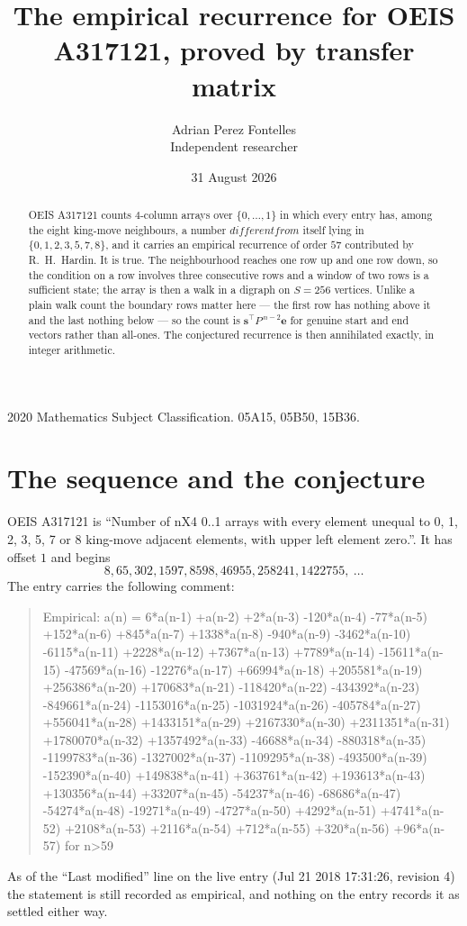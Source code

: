 \documentclass[11pt,a4paper]{article}
\title{The empirical recurrence for OEIS A317121, proved by transfer matrix}
\author{Adrian Perez Fontelles\\ \small Independent researcher}
\date{31 August 2026}
\theoremstyle{plain}
\theoremstyle{definition}
\begin{document}
\maketitle

\begin{abstract}
OEIS A317121 counts $4$-column arrays over $\{0,\dots,1\}$ in which every entry has,
among the eight king-move neighbours, a number $different from$ itself lying in $\{0,1,2,3,5,7,8\}$, and it carries an empirical
recurrence of order $57$ contributed by R.~H.~Hardin. It is true. The neighbourhood
reaches one row up and one row down, so the condition on a row involves three consecutive
rows and a window of two rows is a sufficient state; the array is then a walk in a digraph
on $S=256$ vertices. Unlike a plain walk count the boundary rows matter here --- the first
row has nothing above it and the last nothing below --- so the count is
$\mathbf{s}^{\!\top}P^{\,n-2}\mathbf{e}$ for genuine start and end vectors rather than
all-ones. The conjectured recurrence is then annihilated exactly, in integer arithmetic.
\end{abstract}

\noindent\small 2020 Mathematics Subject Classification. 05A15, 05B50, 15B36.\normalsize

\section{The sequence and the conjecture}

OEIS A317121 is ``Number of nX4 0..1 arrays with every element unequal to 0, 1, 2, 3, 5, 7 or 8 king-move adjacent elements, with upper left element zero.''. It has offset
$1$ and begins
\[
8, 65, 302, 1597, 8598, 46955, 258241, 1422755,\ \dots
\]
The entry carries the following comment:
\begin{quote}\small
Empirical: a(n) = 6*a(n-1) +a(n-2) +2*a(n-3) -120*a(n-4) -77*a(n-5) +152*a(n-6) +845*a(n-7) +1338*a(n-8) -940*a(n-9) -3462*a(n-10) -6115*a(n-11) +2228*a(n-12) +7367*a(n-13) +7789*a(n-14) -15611*a(n-15) -47569*a(n-16) -12276*a(n-17) +66994*a(n-18) +205581*a(n-19) +256386*a(n-20) +170683*a(n-21) -118420*a(n-22) -434392*a(n-23) -849661*a(n-24) -1153016*a(n-25) -1031924*a(n-26) -405784*a(n-27) +556041*a(n-28) +1433151*a(n-29) +2167330*a(n-30) +2311351*a(n-31) +1780070*a(n-32) +1357492*a(n-33) -46688*a(n-34) -880318*a(n-35) -1199783*a(n-36) -1327002*a(n-37) -1109295*a(n-38) -493500*a(n-39) -152390*a(n-40) +149838*a(n-41) +363761*a(n-42) +193613*a(n-43) +130356*a(n-44) +33207*a(n-45) -54237*a(n-46) -68686*a(n-47) -54274*a(n-48) -19271*a(n-49) -4727*a(n-50) +4292*a(n-51) +4741*a(n-52) +2108*a(n-53) +2116*a(n-54) +712*a(n-55) +320*a(n-56) +96*a(n-57) for n>59
\end{quote}
As of the ``Last modified'' line on the live entry (Jul 21 2018 17:31:26, revision
4) the statement is still recorded as empirical, and nothing on the entry
records it as settled either way.
\end{document}
